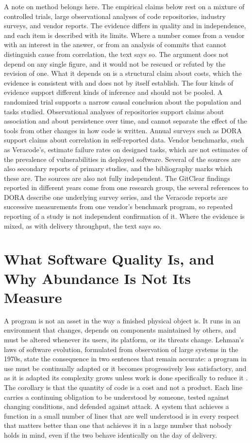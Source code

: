 \documentclass[11pt,a4paper]{article}
\theoremstyle{remark}
\begin{document}
A note on method belongs here. The empirical claims below rest on a mixture of controlled trials, large observational analyses of code repositories, industry surveys, and vendor reports. The evidence differs in quality and in independence, and each item is described with its limits. Where a number comes from a vendor with an interest in the answer, or from an analysis of commits that cannot distinguish cause from correlation, the text says so. The argument does not depend on any single figure, and it would not be rescued or refuted by the revision of one. What it depends on is a structural claim about costs, which the evidence is consistent with and does not by itself establish. The four kinds of evidence support different kinds of inference and should not be pooled. A randomized trial supports a narrow causal conclusion about the population and tasks studied. Observational analyses of repositories support claims about association and about persistence over time, and cannot separate the effect of the tools from other changes in how code is written. Annual surveys such as DORA support claims about correlation in self-reported data. Vendor benchmarks, such as Veracode's, estimate failure rates on designed tasks, which are not estimates of the prevalence of vulnerabilities in deployed software. Several of the sources are also secondary reports of primary studies, and the bibliography marks which these are. The sources are also not fully independent. The GitClear findings reported in different years come from one research group, the several references to DORA describe one underlying survey series, and the Veracode reports are successive measurements from one vendor's benchmark program, so repeated reporting of a study is not independent confirmation of it. Where the evidence is mixed, as with delivery throughput, the text says so.

\section{What Software Quality Is, and Why Abundance Is Not Its Measure}

A program is not an asset in the way a finished physical object is. It runs in an environment that changes, depends on components maintained by others, and must be altered whenever its users, its platform, or its threats change. Lehman's laws of software evolution, formulated from observation of large systems in the 1970s, state the consequence in two sentences that remain accurate: a program in use must be continually adapted or it becomes progressively less satisfactory, and as it is adapted its complexity grows unless work is done specifically to reduce it \cite{Lehman1980}. The corollary is that the quantity of code is a cost and not a product. Each line carries a continuing obligation to be understood by someone, tested against changing conditions, and defended against attack. A system that achieves a function in a small number of lines that are well understood is in every respect that matters better than one that achieves it in a large number that nobody holds in mind, even if the two behave identically on the day of delivery.
\end{document}
